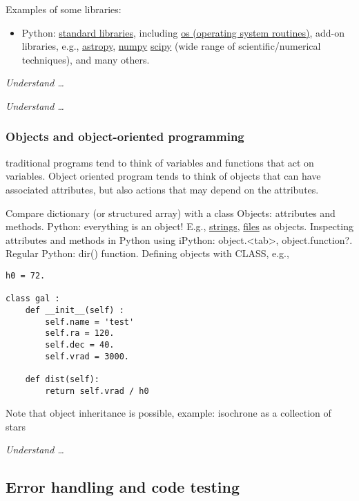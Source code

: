 \documentclass{article}
\newcommand{\test}[1]{%
    \begin{center}
        \colorbox{hl}{\parbox{0.9\textwidth}{\emph{\centering #1}}}
    \end{center}}
\begin{document}
Examples of some libraries:
\begin{itemize}
    \item Python:
        \href{https://docs.python.org/2/library/index.html}
        {standard libraries}, including
        \href{https://docs.python.org/2/library/os.html}
        {os (operating system routines)}, add-on libraries, e.g.,
        \href{http://www.astropy.org}
        {astropy},
        \href{http://www.numpy.org}
        {numpy}
        \href{http://www.scipy.org}
        {scipy} (wide range of scientific/numerical techniques), and
        many others.
\end{itemize}

\test{Understand \ldots}

\test{Understand \ldots}

\subsubsection{Objects and object-oriented programming}

traditional programs tend to think of variables and functions that act
on variables. Object oriented program tends to think of objects that
can have associated attributes, but also actions that may depend on
the attributes.

Compare dictionary (or structured array) with a class
Objects: attributes and methods.
Python:
everything is an object! E.g.,
\href{https://docs.python.org/2/library/stdtypes.html#string-methods}
{strings},
\href{https://docs.python.org/2/tutorial/inputoutput.html#methods-of-file-objects}
{files} as objects.
Inspecting attributes and methods in Python using iPython:
object.<tab>, object.function?. Regular Python: dir() function.
Defining objects with CLASS, e.g.,
\begin{verbatim}
h0 = 72.

class gal :
    def __init__(self) :
        self.name = 'test'
        self.ra = 120.
        self.dec = 40.
        self.vrad = 3000.

    def dist(self):
        return self.vrad / h0
\end{verbatim}
Note that object inheritance is possible, example:
isochrone as a collection of stars

\test{Understand \ldots}

\subsection{Error handling and code testing}
\end{document}
